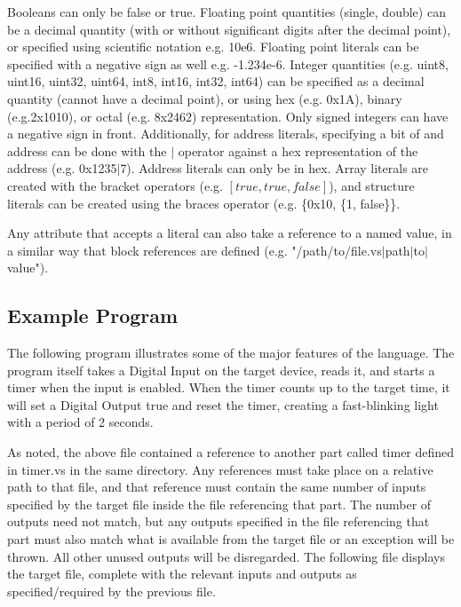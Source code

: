 Booleans can only be false or true. Floating point quantities (single, double) can
be a decimal quantity (with or without significant digits after the decimal point),
or specified using scientific notation e.g. 10e6. Floating point literals can be
specified with a negative sign as well e.g. -1.234e-6. Integer quantities (e.g.
uint8, uint16, uint32, uint64, int8, int16, int32, int64) can be specified as a
decimal quantity (cannot have a decimal point), or using hex (e.g. 0x1A), binary
(e.g.2x1010), or octal (e.g. 8x2462) representation. Only signed integers can have
a negative sign in front. Additionally, for address literals, specifying a bit of
and address can be done with the $\vert$ operator against a hex representation of
the address (e.g. 0x1235$\vert$7). Address literals can only be in hex. Array
literals are created with the bracket operators (e.g. $[true, true, false]$), and
structure literals can be created using the braces operator (e.g. \{0x10, \{1, false\}\}.

Any attribute that accepts a literal can also take a reference to a named value,
in a similar way that block references are defined (e.g. "/path/to/file.vs$\vert$path$\vert$to$\vert$value").

\subsection{Example Program}

The following program illustrates some of the major features of the language. The
program itself takes a Digital Input on the target device, reads it, and starts a
timer when the input is enabled. When the timer counts up to the target time, it
will set a Digital Output true and reset the timer, creating a fast-blinking light
with a period of 2 seconds.


As noted, the above file contained a reference to another part called timer defined
in timer.vs in the same directory. Any references must take place on a relative path
to that file, and that reference must contain the same number of inputs specified by
the target file inside the file referencing that part. The number of outputs need
not match, but any outputs specified in the file referencing that part must also
match what is available from the target file or an exception will be thrown. All
other unused outputs will be disregarded. The following file displays the target
file, complete with the relevant inputs and outputs as specified/required by the
previous file.

